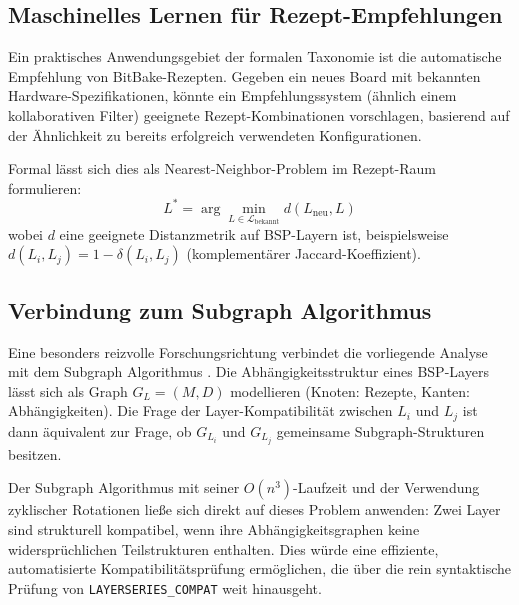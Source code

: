 ﻿\documentclass[a4paper,12pt]{article}
\theoremstyle{definition}
\begin{document}
\subsection{Maschinelles Lernen für Rezept-Empfehlungen}

Ein praktisches Anwendungsgebiet der formalen Taxonomie ist die
automatische Empfehlung von BitBake-Rezepten. Gegeben ein neues Board
mit bekannten Hardware-Spezifikationen, könnte ein Empfehlungssystem
(ähnlich einem kollaborativen Filter) geeignete Rezept-Kombinationen
vorschlagen, basierend auf der Ähnlichkeit zu bereits erfolgreich
verwendeten Konfigurationen.

Formal lässt sich dies als Nearest-Neighbor-Problem im Rezept-Raum formulieren:
\[
L^* = \arg\min_{L \in \mathcal{L}_{\mathrm{bekannt}}} d(L_{\mathrm{neu}}, L)
\]
wobei $d$ eine geeignete Distanzmetrik auf BSP-Layern ist, beispielsweise
$d(L_i, L_j) = 1 - \delta(L_i, L_j)$ (komplementärer Jaccard-Koeffizient).

\subsection{Verbindung zum Subgraph Algorithmus}

Eine besonders reizvolle Forschungsrichtung verbindet die vorliegende Analyse
mit dem Subgraph Algorithmus \cite{epp2026}.
Die Abhängigkeitsstruktur eines BSP-Layers lässt sich als Graph
$G_L = (M, D)$ modellieren (Knoten: Rezepte, Kanten: Abhängigkeiten).
Die Frage der Layer-Kompatibilität zwischen $L_i$ und $L_j$ ist dann äquivalent
zur Frage, ob $G_{L_i}$ und $G_{L_j}$ gemeinsame Subgraph-Strukturen besitzen.

Der Subgraph Algorithmus mit seiner $O(n^3)$-Laufzeit und der Verwendung zyklischer
Rotationen ließe sich direkt auf dieses Problem anwenden:
Zwei Layer sind strukturell kompatibel, wenn ihre Abhängigkeitsgraphen
keine widersprüchlichen Teilstrukturen enthalten. Dies würde eine effiziente,
automatisierte Kompatibilitätsprüfung ermöglichen, die über die rein
syntaktische Prüfung von \texttt{LAYERSERIES\_COMPAT} weit hinausgeht.
\end{document}
